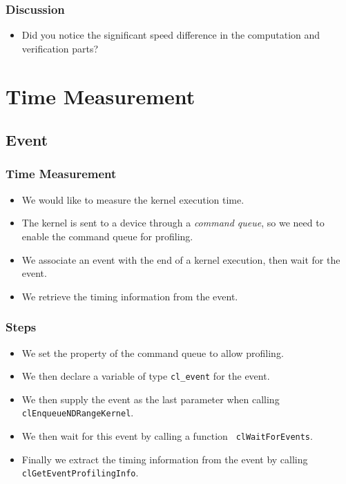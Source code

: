 \documentclass{beamer}
\begin{document}
\begin{frame}
  \frametitle{Discussion}
  \begin{itemize}
  \item Did you notice the significant speed difference in the
    computation and verification parts?
  \end{itemize}
\end{frame}

\section{Time Measurement}

\subsection{Event}

\begin{frame}
  \frametitle{Time Measurement}
  \begin{itemize}
    \item We would like to measure the kernel execution time.
    \item The kernel is sent to a device through a {\em command
      queue}, so we need to enable the command queue for profiling.
    \item We associate an event with the end of a kernel execution,
      then wait for the event.
    \item We retrieve the timing information from the event.
  \end{itemize}
\end{frame}

\begin{frame}
  \frametitle{Steps}
  \begin{itemize}
    \item We set the property of the command queue to allow profiling.
    \item We then declare a variable of type {\tt cl\_event} for
      the event.
    \item We then supply the event as the last parameter when calling
      {\tt clEnqueueNDRangeKernel}.
    \item We then wait for this event by calling a function {\tt
      clWaitForEvents}.
    \item Finally we extract the timing information from the event by
      calling {\tt clGetEventProfilingInfo}.
  \end{itemize}
\end{frame}
\end{document}
